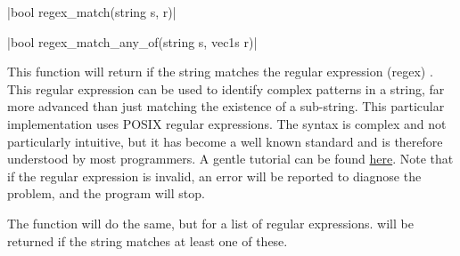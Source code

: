 \funcitem \vectorfunc \cppinline|bool regex_match(string s, r)| 

\vectorfunc \cppinline|bool regex_match_any_of(string s, vec1s r)| 

This function will return \cpptrue if the string  matches the regular expression (regex) . This regular expression can be used to identify complex patterns in a string, far more advanced than just matching the existence of a sub-string. This particular implementation uses POSIX regular expressions. The syntax is complex and not particularly intuitive, but it has become a well known standard and is therefore understood by most programmers. A gentle tutorial can be found \href{http://www.zytrax.com/tech/web/regex.htm}{here}. Note that if the regular expression is invalid, an error will be reported to diagnose the problem, and the program will stop.

The function  will do the same, but for a list of regular expressions. \cpptrue will be returned if the string  matches at least one of these.

